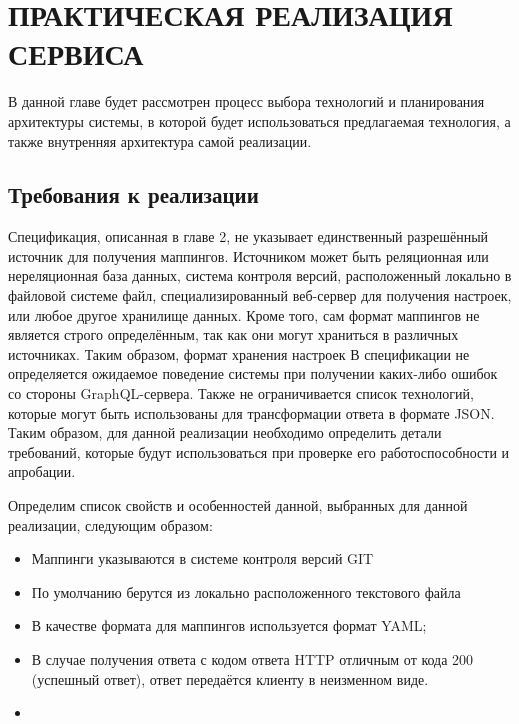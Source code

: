 \chapter{ПРАКТИЧЕСКАЯ РЕАЛИЗАЦИЯ СЕРВИСА}\label{ch:ch3-implementation}

В данной главе будет рассмотрен процесс выбора технологий и планирования архитектуры системы, в которой будет использоваться предлагаемая технология, а также внутренняя архитектура самой реализации.

\section{Требования к реализации}\label{sec:implementation-requirements}

Спецификация, описанная в главе 2, не указывает единственный разрешённый источник для получения маппингов.
Источником может быть реляционная или нереляционная база данных, система контроля версий, расположенный локально в файловой системе файл, специализированный веб-сервер для получения настроек, или любое другое хранилище данных.
Кроме того, сам формат маппингов не является строго определённым, так как они могут храниться в различных источниках.
Таким образом, формат хранения настроек
В спецификации не определяется ожидаемое поведение системы при получении каких-либо ошибок со стороны GraphQL-сервера.
Также не ограничивается список технологий, которые могут быть использованы для трансформации ответа в формате JSON\@.
Таким образом, для данной реализации необходимо определить детали требований, которые будут использоваться при проверке его работоспособности и апробации.

Определим список свойств и особенностей данной, выбранных для данной реализации, следующим образом:
\begin{itemize}
	\item Маппинги указываются в системе контроля версий GIT
	\item По умолчанию берутся из локально расположенного текстового файла
	\item В качестве формата для маппингов используется формат YAML;
	\item В случае получения ответа с кодом ответа HTTP отличным от кода 200 (успешный ответ), ответ передаётся клиенту в неизменном виде.
	\item
\end{itemize}



